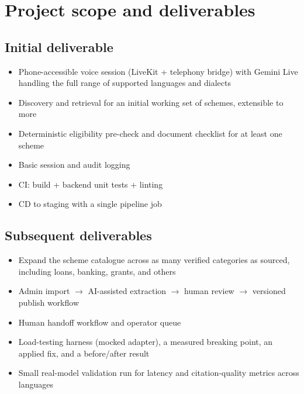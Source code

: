 \documentclass[11pt,a4paper]{article}
\begin{document}
\section{Project scope and deliverables}
\subsection{Initial deliverable}
\begin{itemize}[leftmargin=0.7cm]
    \item Phone-accessible voice session (LiveKit + telephony bridge) with Gemini Live handling the full range of supported languages and dialects
    \item Discovery and retrieval for an initial working set of schemes, extensible to more
    \item Deterministic eligibility pre-check and document checklist for at least one scheme
    \item Basic session and audit logging
    \item CI: build + backend unit tests + linting
    \item CD to staging with a single pipeline job
\end{itemize}

\subsection{Subsequent deliverables}
\begin{itemize}[leftmargin=0.7cm]
    \item Expand the scheme catalogue across as many verified categories as sourced, including loans, banking, grants, and others
    \item Admin import $\rightarrow$ AI-assisted extraction $\rightarrow$ human review $\rightarrow$ versioned publish workflow
    \item Human handoff workflow and operator queue
    \item Load-testing harness (mocked adapter), a measured breaking point, an applied fix, and a before/after result
    \item Small real-model validation run for latency and citation-quality metrics across languages
\end{itemize}
\end{document}
